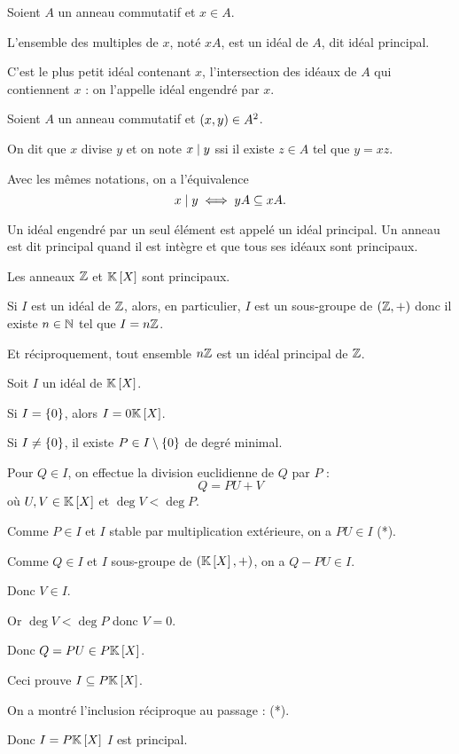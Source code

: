 \begin{prop}
Soient \(A\) un anneau commutatif et \(x\in A\).

L'ensemble des multiples de \(x\), noté \(xA\), est un idéal de \(A\), dit idéal principal.

C'est le plus petit idéal contenant \(x\), \cad l'intersection des idéaux de \(A\) qui contiennent \(x\) : on l'appelle idéal engendré par \(x\).
\end{prop}

\begin{defi}
Soient \(A\) un anneau commutatif et \(\left(x,y\right)\in A^2\).

On dit que \(x\) divise \(y\) et on note \(x\mid y\) ssi il existe \(z\in A\) tel que \(y=xz\).
\end{defi}

\begin{prop}
Avec les mêmes notations, on a l'équivalence \[x\mid y\iff yA\subseteq xA.\]
\end{prop}

Un idéal engendré par un seul élément est appelé un idéal principal. Un anneau est dit principal quand il est intègre et que tous ses idéaux sont principaux.

\begin{prop}
Les anneaux \(\mathbb{Z}\) et \(\poly\) sont principaux.
\end{prop}

\begin{dem}
Si \(I\) est un idéal de \(\mathbb{Z}\), alors, en particulier, \(I\) est un sous-groupe de \(\groupe{\Z}\) donc il existe \(n\in\mathbb{N}\) tel que \(I=n\mathbb{Z}\).

Et réciproquement, tout ensemble \(n\mathbb{Z}\) est un idéal principal de \(\mathbb{Z}\).
\end{dem}

\begin{dem}
Soit \(I\) un idéal de \(\poly\).

Si \(I=\left\lbrace0\right\rbrace\), alors \(I=0\poly\).

Si \(I\not=\left\lbrace0\right\rbrace\), il existe \(P\in I\setminus\left\lbrace0\right\rbrace\) de degré minimal.

Pour \(Q\in I\), on effectue la division euclidienne de \(Q\) par \(P\) : \[Q=PU+V\] où \(U,V\in\poly\) et \(\deg V<\deg P\).

Comme \(P\in I\) et \(I\) stable par multiplication extérieure, on a \(PU\in I\) (*).

Comme \(Q\in I\) et \(I\) sous-groupe de \(\groupe{\poly}\), on a \(Q-PU\in I\).

Donc \(V\in I\).

Or \(\deg V<\deg P\) donc \(V=0\).

Donc \(Q=PU\in P\poly\).

Ceci prouve \(I\subset P\poly\).

On a montré l'inclusion réciproque au passage : (*).

Donc \(I=P\poly\) \ie \(I\) est principal.
\end{dem}

